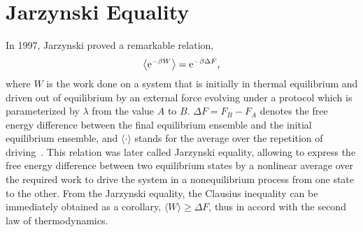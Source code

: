 \section{Jarzynski Equality}






\par In 1997, Jarzynski proved a remarkable relation,
\begin{align}
\left\langle{\rm e}^{-\beta W}\right\rangle={\rm e}^{-\beta\Delta F} \text{,} \label{FT:eq:Jarzynski_equality}
\end{align}
where $W$ is the work done on a system that is initially in thermal equilibrium and driven out of equilibrium by an external force evolving under a protocol which is parameterized by $\lambda$ from the value $A$ to $B$. $\Delta F=F_B-F_A$ denotes the free energy difference between the final equilibrium ensemble and the initial equilibrium ensemble, and $\langle\cdot\rangle$ stands for the average over the repetition of driving~\cite{Jarzynski_PhysRevLett_1997, Jarzynski_PhysRevE_1997, Jarzynski_JStatMech_2004, Jarzynski_EurPhysJB_2008, Jarzynski_AnnuRevCondensMatterPhys_2011}. This relation was later called Jarzynski equality, allowing to express the free energy difference between two equilibrium states by a nonlinear average over the required work to drive the system in a nonequilibrium process from one state to the other. From the Jarzynski equality, the Clausius inequality can be immediately obtained as a corollary, $\langle W\rangle\ge\Delta F$, thus in accord with the second law of thermodynamics. 


